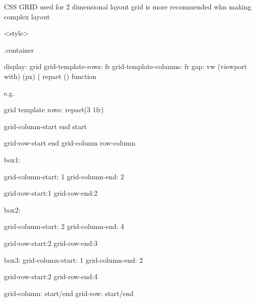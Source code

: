 CSS GRID
    used for 2 dimensional layout
    grid is more recommended whn making complex layout


    <style>

    .container
        {
            display: grid
            grid-template-rows: fr 
            grid-template-columns: fr
            gap: vw (viewport with) (px) (%
            repaet () function

                e.g.

                grid template rows:
                repaet(3 1fr)

grid-column-start
end
start
    
grid-row-start
end
grid-column
row-column
        }


box1:

grid-column-start: 1
grid-column-end: 2

grid-row-start:1
grid-row-end:2

box2:

grid-column-start: 2
grid-column-end: 4

grid-row-start:2
grid-row-end:3

box3:
grid-column-start: 1
grid-column-end: 2

grid-row-start:2
grid-row-end:4


grid-column: start/end
grid-row: start/end